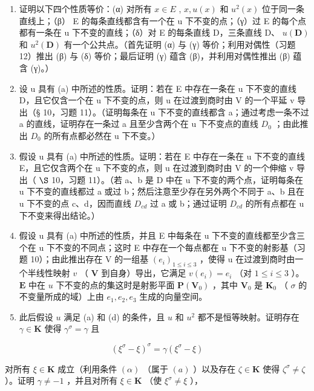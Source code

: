 \begin{enumerate}
\def\labelenumi{(\alph{enumi})}
\item
  证明以下四个性质等价：(α) 对所有 \(x \in E\) , \(x, u(x)\) 和 \(u^{2}(x)\) 位于同一条直线上；（β） E 的每条直线都含有一个在 u 下不变的点；（γ）过 E 的每个点都有一条在 u 下不变的直线；（δ）对 E 的每条直线 D，三条直线 D、 \(u(\mathbf{D})\) 和 \(u^{2}(\mathbf{D})\) 有一个公共点。（首先证明 (α) 与 (γ) 等价；利用对偶性（习题 12）推出 (β) 与 (δ) 等价；最后证明 (γ) 蕴含 (β)，并利用对偶性推出 (β) 蕴含 (γ)。）
\item
  设 u 具有 (a) 中所述的性质。证明：若在 E 中存在一条在 u 下不变的直线 D，且它仅含一个在 u 下不变的点，则 u 在过渡到商时由 V 的一个平延 v 导出（§ 10，习题 11）。（证明每条在 u 下不变的直线都含 a；通过考虑一条不过 a 的直线，证明存在一条过 a 且至少含两个在 u 下不变点的直线 \(D_{0}\) ；由此推出 \(D_{0}\) 的所有点都必然在 u 下不变。）
\item
  假设 u 具有 (a) 中所述的性质。证明：若在 E 中存在一条在 u 下不变的直线 E，且它仅含两个在 u 下不变的点，则 u 在过渡到商时由 V 的一个伸缩 v 导出（ \(\S\) 10，习题 11）。（若 a、b 是 D 中在 u 下不变的两个点，证明每条在 u 下不变的直线都过 a 或过 b；然后注意至少存在另外两个不同于 a、b 且在 u 下不变的点 c、d，因而直线 \(D_{cd}\) 过 a 或 b；通过证明 \(D_{cd}\) 的所有点都在 u 下不变来得出结论。）
\item
  假设 u 具有 (a) 中所述的性质，并且 E 中每条在 u 下不变的直线都至少含三个在 u 下不变的不同点；这时 E 中存在一个每点都在 u 下不变的射影基（习题 10）；由此推出存在 V 的一组基 \((e_{i})_{1\leq i\leq3}\) ，使得 u 在过渡到商时由一个半线性映射 \(v\) （ \(\mathbf{V}\) 到自身）导出，它满足 \(v(e_i) = e_i\) （对 \(1 \leqslant i \leqslant 3\) ）。 \(\mathbf{E}\) 中在 \(u\) 下不变的点的集这时是射影平面 \(\mathbf{P}(\mathbf{V}_0)\) ，其中 \(\mathbf{V}_0\) 是 \(\mathbf{K}_0\) （ \(\sigma\) 的不变量所成的域）上由 \(e_1, e_2, e_3\) 生成的向量空间。
\item
  此后假设 \(u\) 满足 (a) 和 (d) 的条件，且 \(u\) 和 \(u^2\) 都不是恒等映射。证明存在 \(\gamma \in \mathbf{K}\) 使得 \(\gamma^\sigma = \gamma\) 且
\end{enumerate}

\[
(\xi^ {\sigma} - \xi) ^ {\sigma} = \gamma (\xi^ {\sigma} - \xi)\tag{1}
\]

对所有 \(\xi \in \mathbf{K}\) 成立（利用条件 \((\alpha)\) （属于 \((a)\) ）以及存在 \(\zeta \in \mathbf{K}\) 使得 \(\zeta^{\sigma} \neq \zeta\) ）。证明 \(\gamma \neq -1\) ，并且对所有 \(\xi \in \mathbf{K}\) （使 \(\xi^{\sigma} \neq \xi\) ），

